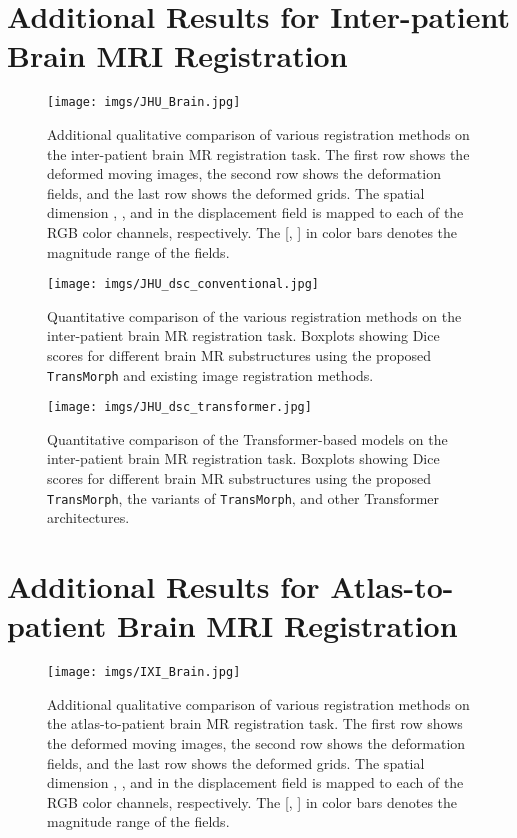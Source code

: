 \documentclass[times,twocolumn,final]{elsarticle}
\begin{document}
\section{Additional Results for Inter-patient Brain MRI Registration}
\label{sec:add_inter_MR}
\begin{figure*}[!htp]
\centering
\texttt{[image: imgs/JHU\_Brain.jpg]}
\caption{Additional qualitative comparison of various registration methods on the inter-patient brain MR registration task. The first row shows the deformed moving images, the second row shows the deformation fields, and the last row shows the deformed grids. The spatial dimension , , and  in the displacement field is mapped to each of the RGB color channels, respectively. The [, ] in color bars denotes the magnitude range of the fields.\label{fig:jhu_brain}}
\end{figure*}

\begin{figure*}[!htp]
\centering
\texttt{[image: imgs/JHU\_dsc\_conventional.jpg]}
\caption{Quantitative comparison of the various registration methods on the inter-patient brain MR registration task. Boxplots showing Dice scores for different brain MR substructures using the proposed \texttt{TransMorph} and existing image registration methods. \label{fig:jhu_brain_conventional}}
\end{figure*}

\begin{figure*}[!htp]
\centering
\texttt{[image: imgs/JHU\_dsc\_transformer.jpg]}
\caption{Quantitative comparison of the Transformer-based models on the inter-patient brain MR registration task. Boxplots showing Dice scores for different brain MR substructures using the proposed \texttt{TransMorph}, the variants of \texttt{TransMorph}, and other Transformer architectures.\label{fig:jhu_brain_transformer}}
\end{figure*}

\newpage
\section{Additional Results for Atlas-to-patient Brain MRI Registration}
\label{sec:add_atlas_MR}
\begin{figure*}[!htp]
\centering
\texttt{[image: imgs/IXI\_Brain.jpg]}
\caption{Additional qualitative comparison of various registration methods on the atlas-to-patient brain MR registration task. The first row shows the deformed moving images, the second row shows the deformation fields, and the last row shows the deformed grids. The spatial dimension , , and  in the displacement field is mapped to each of the RGB color channels, respectively. The [, ] in color bars denotes the magnitude range of the fields.\label{fig:IXI_brain}}
\end{figure*}
\end{document}
